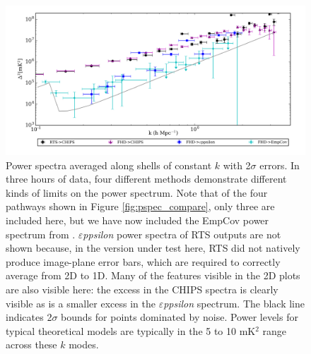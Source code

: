 \documentclass[twolcolumn,iop]{emulateapj}
\def\eppsilon{{\it $\varepsilon$ppsilon}}
\def\empirical{EmpCov}
\def\dilloncite{\cite{PhysRevD.91.123011} }
\begin{document}
\begin{figure}[htbp]

\includegraphics[width=\textwidth]{figures/MWA_PS_Compare/MWAPipeline_compare_1d_radial_logbryna.png}
\caption{Power spectra averaged along shells of constant $k$ with 2$\sigma$ errors. In three hours of data, four different methods demonstrate different kinds of limits on the power spectrum. Note that of the four pathways shown in Figure \ref{fig:pspec_compare}, only three are included here, but we have now included the \empirical{} power spectrum from \dilloncite{}.  \eppsilon{} power spectra of RTS outputs are not shown because, in the version under test here, RTS did not natively produce image-plane error bars, which are required to correctly average from 2D to 1D. Many of the features visible in the 2D plots are also visible here: the excess in the CHIPS spectra is clearly visible as is a smaller excess in the \eppsilon{} spectrum.  The black line indicates 2$\sigma$ bounds for points dominated by noise.  Power levels for typical theoretical models are typically in the 5 to 10 mK$^2$ range across these $k$ modes.
\label{fig:1D_pspecs}}

\end{figure}
\end{document}

